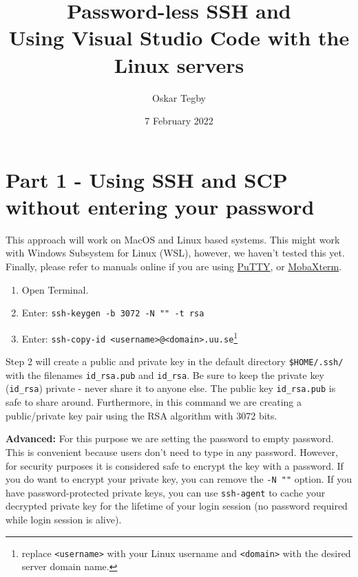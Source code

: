 \documentclass[10pt]{article}
\title{Password-less SSH and \\ Using Visual Studio Code with the Linux servers}
\author{Oskar Tegby}
\date{7 February 2022}
\begin{document}
\maketitle

\section{Part 1 - Using SSH and SCP without entering your password}
This approach will work on MacOS and Linux based systems. This might work with Windows Subsystem for Linux
(WSL), however, we haven't tested this yet. Finally, please refer to manuals online if you are using
\href{https://devops.ionos.com/tutorials/use-ssh-keys-with-putty-on-windows/}{PuTTY}, or
\href{https://ubccr.freshdesk.com/support/solutions/articles/13000034093-using-ssh-keys-with-mobaxterm-windows-}{MobaXterm}.

\begin{enumerate}
\item Open Terminal.
\item Enter: \texttt{ssh-keygen -b 3072 -N "" -t rsa}
\item Enter: \texttt{ssh-copy-id <username>@<domain>.uu.se}\footnote{replace \texttt{<username>} with your Linux username and \texttt{<domain>} with the desired server domain name.}
\end{enumerate}

Step 2 will create a public and private key in the default directory \texttt{\$HOME/.ssh/} with the
filenames \texttt{id\_rsa.pub} and \texttt{id\_rsa}. Be sure to keep the private key (\texttt{id\_rsa})
private - never share it to anyone else. The public key \texttt{id\_rsa.pub} is safe to share
around. Furthermore, in this command we are creating a public/private key pair using the RSA
algorithm with 3072 bits. 

\textbf{Advanced: }For this purpose we are setting the password to empty password. This is
convenient because users don't need to type in any password. However, for security purposes it is
considered safe to encrypt the key with a password. If you do want to encrypt your private key, you
can remove the \texttt{-N ""} option. If you have password-protected private keys, you can use
\texttt{ssh-agent} to cache your decrypted private key for the lifetime of your login session (no
password required while login session is alive).

\end{document}
